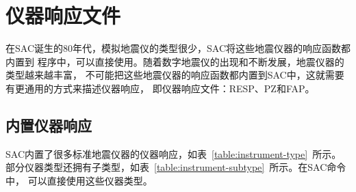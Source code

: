 \section{仪器响应文件}
在SAC诞生的80年代，模拟地震仪的类型很少，SAC将这些地震仪器的响应函数都内置到
程序中，可以直接使用。随着数字地震仪的出现和不断发展，地震仪器的类型越来越丰富，
不可能把这些地震仪器的响应函数都内置到SAC中，这就需要有更通用的方式来描述仪器响应，
即仪器响应文件：RESP、PZ和FAP。

\subsection{内置仪器响应}
SAC内置了很多标准地震仪器的仪器响应，如表~\ref{table:instrument-type}~所示。
部分仪器类型还拥有子类型，如表~\ref{table:instrument-subtype}~所示。在SAC命令中，
可以直接使用这些仪器类型。

